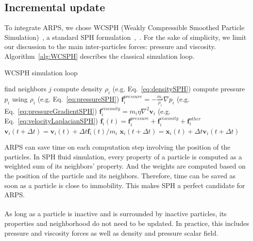 \subsection{ Incremental update }
To integrate ARPS, we chose WCSPH (Weakly Compressible Smoothed Particle Simulation)~\cite{Becker2007WCSPH}, a standard SPH formulation~\cite{Desbrun1996},~\cite{Muller2003}. For the sake of simplicity, we limit our discussion to the main inter-particles forces: pressure and viscosity. 
Algorithm~\ref{alg:WCSPH} describes the classical simulation loop.

\newpage

\begin{algorithm}[H]
    \caption[ARPS: WCSPH simulation]{WCSPH simulation loop}
    \label{alg:WCSPH}
    \begin{algorithmic}
	    \State find neighbors $j$
    \EndFor
    \State compute density $\rho_{i}$ (e.g. Eq.~\ref{eq:densitySPH})
    \State compute pressure $p_{i}$ using $\rho_{i}$ (e.g. Eq.~\ref{eq:pressureSPH})
    \EndFor
    \State $\displaystyle \mathbf{f}_{i}^{pressure} = -\frac{m_{i}}{\rho_{i}}\nabla p_{i}$ (e.g. Eq.~\ref{eq:pressureGradientSPH})
    \State $\displaystyle \mathbf{f}_{i}^{viscosity} = m_{i}\eta\nabla^{2}\mathbf{v}_{i}$ (e.g. Eq.~\ref{eq:velocityLaplacianSPH})
    \State $\displaystyle \mathbf{f}_{i}(t) = \mathbf{f}_{i}^{pressure} + \mathbf{f}_{i}^{viscosity} + \mathbf{f}_{i}^{other}$
    \EndFor
    \State $\mathbf{v}_{i}(t+\Delta t) = \mathbf{v}_{i}(t) + \Delta t \mathbf{f}_{i}(t)/m_{i}$
    \State $\mathbf{x}_{i}(t+\Delta t) = \mathbf{x}_{i}(t) + \Delta t \mathbf{v}_{i}(t+\Delta t)$
    \EndFor
    \end{algorithmic}
\end{algorithm}

ARPS can save time on each computation step involving the position of the particles.
In SPH fluid simulation, every property of a particle is computed as a weighted sum of its neighbors' property.
And the weights are computed based on the position of the particle and its neighbors.
Therefore, time can be saved as soon as a particle is close to immobility. 
This makes SPH a perfect candidate for ARPS.
\paragraph*{}
As long as a particle is inactive and is surrounded by inactive particles, its properties and neighborhood do not need to be updated.
In practice, this includes pressure and viscosity forces as well as density and pressure scalar field.

